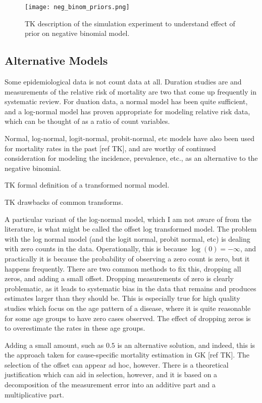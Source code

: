 \begin{figure}
\begin{center}
\texttt{[image: neg\_binom\_priors.png]}
\end{center}
\caption{TK description of the simulation experiment to understand effect of prior on negative binomial model.}
\label{fig:theory-rate_model-neg_binom_priors}
\end{figure}

\subsection{Alternative Models}
Some epidemiological data is not count data at all.  Duration studies
are and measurements of the relative risk of mortality are two that
come up frequently in systematic review.  For duation data, a normal
model  has been quite sufficient, and a log-normal model has proven
appropriate for modeling relative risk data, which can be thought of
as a ratio of count variables.

Normal, log-normal, logit-normal, probit-normal, etc models have also
been used for mortality rates in the past [ref TK], and are worthy of
continued consideration for modeling the incidence, prevalence, etc.,
as an alternative to the negative binomial.

TK formal definition of a transformed normal model.

TK drawbacks of common transforms.

A particular variant of the log-normal model, which I am not aware of
from the literature, is what might be called the offset log
transformed model.  The problem with the log normal model (and the
logit normal, probit normal, etc) is dealing with zero counts in the
data.  Operationally, this is because $\log(0) = -\infty$, and
practically it is because the probability of observing a zero
count is zero, but it happens frequently.  There are two common
methods to fix this, dropping all zeros, and adding a small offset.
Dropping measurements of zero is clearly problematic, as it leads to
systematic bias in the data that remains and produces estimates larger
than they should be.  This is especially true for high quality studies
which focus on the age pattern of a disease, where it is quite
reasonable for some age groups to have zero cases observed.  The
effect of dropping zeros is to overestimate the rates in these age
groups.

Adding a small amount, such as $0.5$ is an alternative solution, and
indeed, this is the approach taken for cause-specific mortality estimation
in GK [ref TK].  The selection of the offset can appear ad hoc,
however.  There is a theoretical justification which can aid in
selection, however, and it is based on a decomposition of the
measurement error into an additive part and a multiplicative part.


